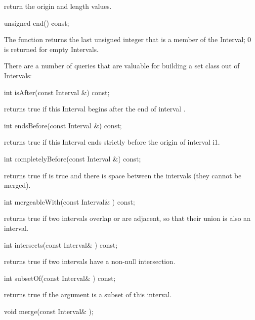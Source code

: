 return the origin and length values.

\begin{example}
unsigned end() const;
\end{example}

The  function returns the last unsigned integer that is a
member of the Interval; 0 is returned for empty Intervals.

There are a number of queries that are valuable for building a set
class out of Intervals:

\begin{example}
int isAfter(const Interval &) const;
\end{example}

 returns true if this Interval begins after the end of
interval 
.
\begin{example}
int endsBefore(const Interval &) const;
\end{example}

 returns true if this Interval ends strictly before
the origin of interval i1.

\begin{example}
int completelyBefore(const Interval &) const;
\end{example}

 returns true if  is true and there
is space between the intervals (they cannot be merged).

\begin{example}
int mergeableWith(const Interval& ) const;
\end{example}

 returns true if two intervals overlap or are
adjacent, so that their union is also an interval.

\begin{example}
int intersects(const Interval& ) const;
\end{example}

 returns true if two intervals have a non-null
intersection.

\begin{example}
int subsetOf(const Interval& ) const;
\end{example}

 returns true if the argument is a subset of this interval.

\begin{example}
void merge(const Interval& );
\end{example}

